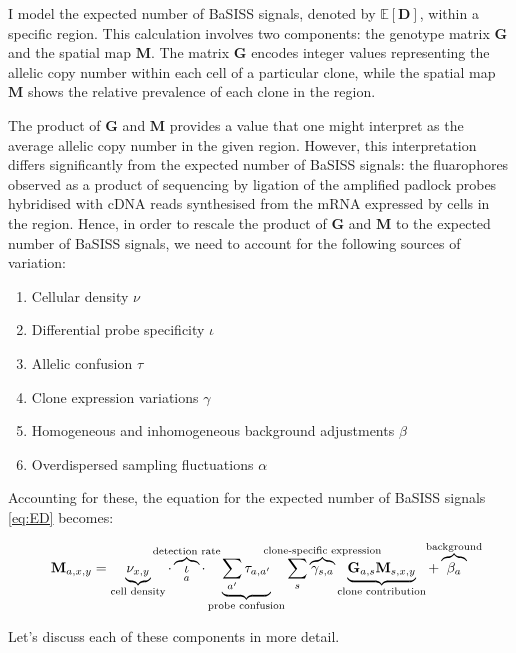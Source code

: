 I model the expected number of \ac{BaSISS} signals, denoted by $\mathbb{E}[\mathbf{D}]$, within a specific region. This calculation involves two components: the genotype matrix $\mathbf{G}$ and the spatial map $\mathbf{M}$. The matrix $\mathbf{G}$ encodes integer values representing the allelic copy number within each cell of a particular clone, while the spatial map $\mathbf{M}$ shows the relative prevalence of each clone in the region.

The product of $\mathbf{G}$ and $\mathbf{M}$ provides a value that one might interpret as the average allelic copy number in the given region. However, this interpretation differs significantly from the expected number of BaSISS signals: the fluarophores observed as a product of sequencing by ligation of the amplified padlock probes hybridised with cDNA reads synthesised from the mRNA expressed by cells in the region. Hence, in order to rescale the product of $\mathbf{G}$ and $\mathbf{M}$ to the expected number of BaSISS signals, we need to account for the following sources of variation:

\begin{enumerate}
    \item Cellular density $\nu$
    \item Differential probe specificity $\iota$
    \item Allelic confusion $\tau$
    \item Clone expression variations $\gamma$
    \item Homogeneous and inhomogeneous background adjustments $\beta$
    \item Overdispersed sampling fluctuations $\alpha$
\end{enumerate}

Accounting for these, the equation for the expected number of BaSISS signals \cref{eq:ED} becomes:

\begin{equation} 
\mathbf{M}_{a, x,y} = \underbrace{\nu_{x,y}}_{\text{cell density}} \cdot \overbrace{\iota}_a^{\mathclap{\text{detection rate}}} \cdot \underbrace{\sum_{a'} \tau_{a,a'}}_{\text{probe confusion}} \sum_s  \overbrace{\gamma_{s,a}}^{\mathclap{\text{clone-specific expression}}} \underbrace{\mathbf{G}_{a,s} \mathbf{M}_{s,x,y}}_{\text{clone contribution}} + \overbrace{\beta_a}^{\mathclap{\text{background}}}
\label{eq:ED_full}\\
\end{equation} 

Let's discuss each of these components in more detail.

